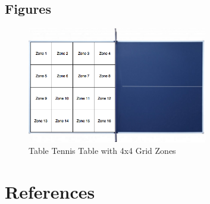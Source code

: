 \documentclass[11pt]{article}
\begin{document}
\subsection{Figures}
\begin{figure}[H]
   \centering
   \includegraphics[width=0.7\textwidth]{diagrams/Zones.png} %
   \caption{Table Tennis Table with 4x4 Grid Zones}
   \label{fig:zones}
\end{figure}
\section{References}
\printbibliography
\end{document}
